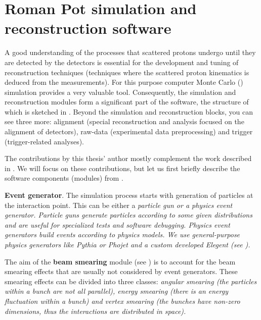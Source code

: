 \chapter[sr]{Roman Pot simulation and reconstruction software}



A good understanding of the processes that scattered protons undergo until they are detected by the  detectors is essential for the development and tuning of reconstruction techniques (techniques where the scattered proton kinematics is deduced from the  measurements). For this purpose computer Monte Carlo () simulation provides a very valuable tool. Consequently, the simulation and reconstruction modules form a significant part of the   software, the structure of which is sketched in . Beyond the simulation and reconstruction blocks, you can see three more: alignment (special reconstruction and analysis focused on the alignment of  detectors), raw-data (experimental data preprocessing) and trigger (trigger-related analyses).

The contributions by this thesis' author mostly complement the work described in . We will focus on these contributions, but let us first briefly describe the software components (modules) from .

\> {\bf Event generator}.
The simulation process starts with generation of particles at the interaction point. This can be either a \em{particle gun} or a \em{physics event generator}. Particle guns generate particles according to some given distributions and are useful for specialized tests and software debugging. Physics event generators build events according to physics models. We use general-purpose physics generators like Pythia  or Phojet  and a custom developed Elegent (see ).

\> The aim of the {\bf beam smearing} module (see ) is to account for the beam smearing effects that are usually not considered by event generators. These smearing effects can be divided into three classes: \em{angular smearing} (the particles within a bunch are not all parallel), \em{energy smearing} (there is an energy fluctuation within a bunch) and \em{vertex smearing} (the bunches have non-zero dimensions, thus the interactions are distributed in space). 

